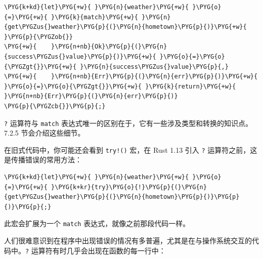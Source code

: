 \begin{Verbatim}[commandchars=\\\{\},breaklines=true,breakanywhere=true,fontsize=\codefont,xleftmargin=17bp]
\PYG{k+kd}{let}\PYG{+w}{ }\PYG{n}{weather}\PYG{+w}{ }\PYG{o}{=}\PYG{+w}{ }\PYG{k}{match}\PYG{+w}{ }\PYG{n}{get\PYGZus{}weather}\PYG{p}{(}\PYG{n}{hometown}\PYG{p}{)}\PYG{+w}{ }\PYG{p}{\PYGZob{}}
\PYG{+w}{    }\PYG{n+nb}{Ok}\PYG{p}{(}\PYG{n}{success\PYGZus{}value}\PYG{p}{)}\PYG{+w}{ }\PYG{o}{=}\PYG{o}{\PYGZgt{}}\PYG{+w}{ }\PYG{n}{success\PYGZus{}value}\PYG{p}{,}
\PYG{+w}{    }\PYG{n+nb}{Err}\PYG{p}{(}\PYG{n}{err}\PYG{p}{)}\PYG{+w}{ }\PYG{o}{=}\PYG{o}{\PYGZgt{}}\PYG{+w}{ }\PYG{k}{return}\PYG{+w}{ }\PYG{n+nb}{Err}\PYG{p}{(}\PYG{n}{err}\PYG{p}{)}
\PYG{p}{\PYGZcb{}}\PYG{p}{;}
\end{Verbatim}

\texttt{?} 运算符与 \texttt{match} 表达式唯一的区别在于，它有一些涉及类型和转换的知识点。7.2.5 节会介绍这些细节。

在旧式代码中，你可能还会看到 \texttt{try!()} 宏，在 Rust 1.13 引入 \texttt{?} 运算符之前，这是传播错误的常用方法：

\begin{Verbatim}[commandchars=\\\{\},breaklines=true,breakanywhere=true,fontsize=\codefont,xleftmargin=17bp]
\PYG{k+kd}{let}\PYG{+w}{ }\PYG{n}{weather}\PYG{+w}{ }\PYG{o}{=}\PYG{+w}{ }\PYG{k+kr}{try}\PYG{o}{!}\PYG{p}{(}\PYG{n}{get\PYGZus{}weather}\PYG{p}{(}\PYG{n}{hometown}\PYG{p}{)}\PYG{p}{)}\PYG{p}{;}
\end{Verbatim}

此宏会扩展为一个 \texttt{match} 表达式，就像之前那段代码一样。

人们很难意识到在程序中出现错误的情况有多普遍，尤其是在与操作系统交互的代码中。\texttt{?} 运算符有时几乎会出现在函数的每一行中：

